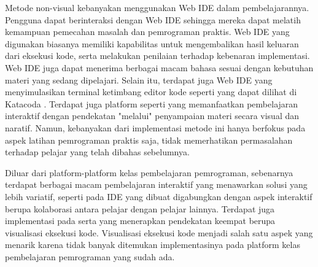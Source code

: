 Metode non-visual kebanyakan menggunakan Web IDE dalam pembelajarannya. Pengguna dapat berinteraksi dengan Web IDE sehingga mereka dapat melatih kemampuan pemecahan masalah dan pemrograman praktis. Web IDE yang digunakan biasanya memiliki kapabilitas untuk mengembalikan hasil keluaran dari eksekusi kode, serta melakukan penilaian terhadap kebenaran implementasi. Web IDE juga dapat menerima berbagai macam bahasa sesuai dengan kebutuhan materi yang sedang dipelajari. Selain itu, terdapat juga Web IDE yang menyimulasikan terminal ketimbang editor kode seperti yang dapat dilihat di Katacoda \parencite{katacoda2021media}. Terdapat juga platform seperti \textcite{progate2021media} yang memanfaatkan pembelajaran interaktif dengan pendekatan "melalui" penyampaian materi secara visual dan naratif. Namun, kebanyakan dari implementasi metode ini hanya berfokus pada aspek latihan pemrograman praktis saja, tidak memerhatikan permasalahan terhadap pelajar yang telah dibahas sebelumnya.

Diluar dari platform-platform kelas pembelajaran pemrograman, sebenarnya terdapat berbagai macam pembelajaran interaktif yang menawarkan solusi yang lebih variatif, seperti pada \textcite{tran2013interactive} IDE yang dibuat digabungkan dengan aspek interaktif berupa kolaborasi antara pelajar dengan pelajar lainnya. Terdapat juga implementasi pada \textcite{guo2013pythontutor} serta \textcite{moons2013pilot} yang menerapkan pendekatan keempat berupa visualisasi eksekusi kode. Visualisasi eksekusi kode menjadi salah satu aspek yang menarik karena tidak banyak ditemukan implementasinya pada platform kelas pembelajaran pemrograman yang sudah ada.



